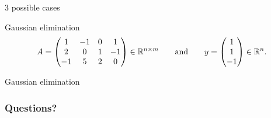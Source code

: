 \documentclass{beamer}
\begin{document}
\begin{frame}[t]{3 possible cases}
	\grid

\end{frame}


\begin{frame}[t]{Gaussian elimination}
	\grid
	$$
	A = 
	\begin{pmatrix}
		1  & -1 & 0 & 1 \\
		2  & 0 & 1 & -1 \\
		-1  & 5 & 2 & 0 
	\end{pmatrix} \in \mathbb{R}^{n \times m}
	\qquad \text{and} \qquad
	y = 
	\begin{pmatrix}
		1 \\
		1 \\
		-1
	\end{pmatrix}
	\in \mathbb{R}^n.
	$$

\end{frame}
\begin{frame}[t]{Gaussian elimination}
	\grid
	\pause
	\pause
\end{frame}
\appendix
\backupbegin
\begin{frame}
	\frametitle{Questions?}
\end{frame}
\backupend
\end{document}
